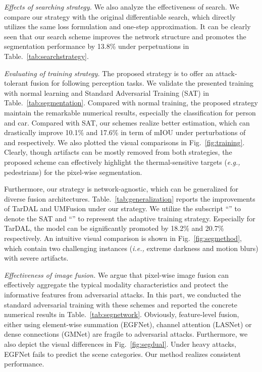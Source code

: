 \documentclass[sigconf]{acmart}
\begin{document}
\textit{Effects of searching strategy.} We also analyze the effectiveness of  search. We compare our strategy with the original differentiable search, which directly utilizes the same loss formulation and one-step approximation. It can be clearly seen that our search scheme improves the network structure and promotes the segmentation performance by 13.8\% under  perpetuations in Table.~\ref{tab:searchstrategy}.



\textit{Evaluating of training strategy.} 
The proposed  strategy is to offer an attack-tolerant fusion for following perception tasks. We validate the presented training with normal learning and Standard Adversarial Training (SAT) in Table.~\ref{tab:segmentation}. Compared with normal training, the proposed strategy maintain the remarkable numerical results, especially the classification for person and car. Compared with SAT, our schemes realize  better estimation, which can drastically improve 10.1\% and 17.6\% in term of mIOU under perturbations of  and  respectively. We also plotted the visual comparisons in Fig.~\ref{fig:training}. Clearly, though artifacts can be mostly removed from both strategies, the proposed scheme can effectively highlight the thermal-sensitive targets (\textit{e.g.,} pedestrians) for the pixel-wise segmentation.


Furthermore, our strategy is network-agnostic, which can be generalized for diverse fusion architectures. Table.~\ref{tab:generalization} reports the improvements of TarDAL and UMFusion under our strategy. We utilize the subscript ``'' to denote the SAT and ``'' to represent the adaptive training strategy. Especially for TarDAL, the model can be significantly promoted by 18.2\% and 20.7\% respectively.
An intuitive visual comparison is shown in Fig.~\ref{fig:segmethod}, which contain two challenging instances (\textit{i.e.,} extreme darkness and motion blurs) with severe artifacts. 



\textit{Effectiveness of image fusion.}
We argue that pixel-wise image fusion can effectively aggregate the typical modality characteristics and protect the informative features from adversarial attacks.  In this part, we conducted the standard adversarial training with these schemes and reported the concrete numerical results in Table.~\ref{tab:segnetwork}. Obviously, feature-level fusion, either using element-wise
summation (EGFNet), channel attention  (LASNet) or dense connections (GMNet) are fragile to adversarial attacks. Furthermore,  we also depict the visual differences in Fig.~\ref{fig:segdual}. Under heavy attacks, 
EGFNet fails to predict the scene categories. 
Our method realizes consistent performance.
\end{document}
